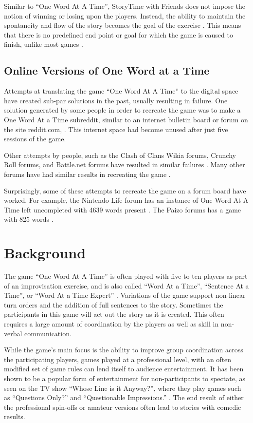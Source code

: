 \documentclass{sigchi}
\begin{document}
Similar to ``One Word At A Time'', StoryTime with Friends does not impose the notion of winning or losing upon the players. Instead, the ability to maintain the spontaneity and flow of the story becomes the goal of the exercise \cite{improv.ca}. This means that there is no predefined end point or goal for which the game is caused to finish, unlike most games \cite{learn-canvas, badge-ville, makeschool}. 

\subsection{Online Versions of One Word at a Time}
Attempts at translating the game ``One Word At A Time'' to the digital space have created sub-par solutions in the past, usually resulting in failure. One solution generated by some people in order to recreate the game was to make a One Word At a Time subreddit, similar to an internet bulletin board or forum on the site reddit.com, \cite{reddit}. This internet space had become unused after just five sessions of the game.

Other attempts by people, such as the Clash of Clans Wikia forums, Crunchy Roll forums, and Battle.net forums have resulted in similar failures \cite{coc-wikia, crunchy-roll, battle.net}. Many other forums have had similar results in recreating the game \cite{minecraft, drummer-world, android}.

Surprisingly, some of these attempts to recreate the game on a forum board have worked. For example, the Nintendo Life forum has an instance of One Word At A Time left uncompleted with 4639 words present \cite{nintendo-life}. The Paizo forums has a game with 825 words \cite{paizo}.

\section{Background}
The game ``One Word At A Time'' is often played with five to ten players as part of an improvisation exercise, and is also called ``Word At a Time'', ``Sentence At a Time'', or ``Word At a Time Expert'' \cite{learnimprov}. Variations of the game support non-linear turn orders and the addition of full sentences to the story. Sometimes the participants in this game will act out the story as it is created. This often requires a large amount of coordination by the players as well as skill in non-verbal communication.

While the game's main focus is the ability to improve group coordination across the participating players, games played at a professional level, with an often modified set of game rules can lend itself to audience entertainment. It has been shown to be a popular form of entertainment for non-participants to spectate, as seen on the TV show ``Whose Line is it Anyway?'', where they play games such as ``Questions Only?'' and ``Questionable Impressions.'' \cite{whoseline}. The end result of either the professional spin-offs or amateur versions often lead to stories with comedic results.
\end{document}
